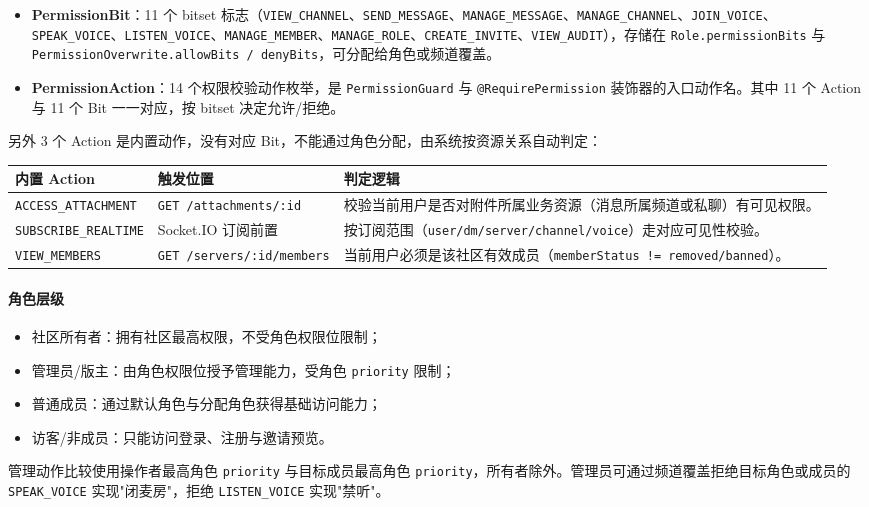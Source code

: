 \begin{itemize}
  \item \textbf{PermissionBit}：11 个 bitset 标志（\texttt{VIEW\_CHANNEL}、\texttt{SEND\_MESSAGE}、\texttt{MANAGE\_MESSAGE}、\texttt{MANAGE\_CHANNEL}、\texttt{JOIN\_VOICE}、\texttt{SPEAK\_VOICE}、\texttt{LISTEN\_VOICE}、\texttt{MANAGE\_MEMBER}、\texttt{MANAGE\_ROLE}、\texttt{CREATE\_INVITE}、\texttt{VIEW\_AUDIT}），存储在 \texttt{Role.permissionBits} 与 \texttt{PermissionOverwrite.allowBits / denyBits}，可分配给角色或频道覆盖。
  \item \textbf{PermissionAction}：14 个权限校验动作枚举，是 \texttt{PermissionGuard} 与 \texttt{@RequirePermission} 装饰器的入口动作名。其中 11 个 Action 与 11 个 Bit 一一对应，按 bitset 决定允许/拒绝。
\end{itemize}

另外 3 个 Action 是内置动作，没有对应 Bit，不能通过角色分配，由系统按资源关系自动判定：

\noindent\begin{tabularx}{\textwidth}{L{3.6cm}L{4.4cm}Y}
  \toprule
  内置 Action & 触发位置 & 判定逻辑 \\
  \midrule
  \texttt{ACCESS\_ATTACHMENT} & \texttt{GET /attachments/:id} & 校验当前用户是否对附件所属业务资源（消息所属频道或私聊）有可见权限。 \\
  \texttt{SUBSCRIBE\_REALTIME} & Socket.IO 订阅前置 & 按订阅范围（\texttt{user/dm/server/channel/voice}）走对应可见性校验。 \\
  \texttt{VIEW\_MEMBERS} & \texttt{GET /servers/:id/members} & 当前用户必须是该社区有效成员（\texttt{memberStatus != removed/banned}）。 \\
  \bottomrule
\end{tabularx}

\paragraph{角色层级}
\begin{itemize}
  \item 社区所有者：拥有社区最高权限，不受角色权限位限制；
  \item 管理员/版主：由角色权限位授予管理能力，受角色 \texttt{priority} 限制；
  \item 普通成员：通过默认角色与分配角色获得基础访问能力；
  \item 访客/非成员：只能访问登录、注册与邀请预览。
\end{itemize}

管理动作比较使用操作者最高角色 \texttt{priority} 与目标成员最高角色 \texttt{priority}，所有者除外。管理员可通过频道覆盖拒绝目标角色或成员的 \texttt{SPEAK\_VOICE} 实现"闭麦房"，拒绝 \texttt{LISTEN\_VOICE} 实现"禁听"。

